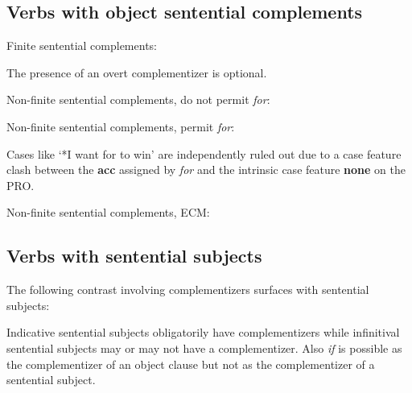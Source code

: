\subsection{Verbs with object sentential complements}
Finite sentential complements:


The presence of an overt complementizer is optional.

Non-finite sentential complements, do not permit {\em for}:


Non-finite sentential complements, permit {\em for}:


Cases like `*I want for to win' are independently ruled out due to a 
case feature clash between the {\bf acc} assigned by {\em for} and the
intrinsic case feature {\bf none} on the PRO.

Non-finite sentential complements, ECM:



\subsection{Verbs with sentential subjects}
The following contrast involving complementizers surfaces with sentential
subjects:


Indicative sentential subjects obligatorily have complementizers while
infinitival sentential subjects may or may not have a complementizer. 
Also {\em if} is possible as the complementizer of an object clause
but not as the complementizer of a sentential subject. 

